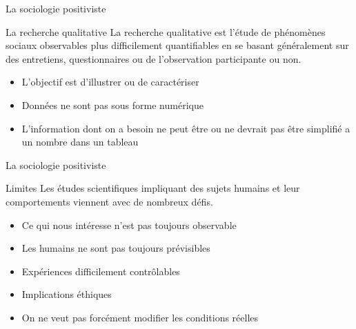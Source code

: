 \documentclass[10pt]{beamer}
\begin{document}
\begin{frame}{La sociologie positiviste}
    \begin{block}{La recherche qualitative}
        La recherche qualitative est l'étude de phénomènes sociaux observables plus difficilement quantifiables en se basant généralement sur des entretiens, questionnaires ou de l'observation participante ou non.
    \begin{itemize}
        \item L'objectif est d'illustrer ou de caractériser
        \item Données ne sont pas sous forme numérique
        \item L'information dont on a besoin ne peut être ou ne devrait pas être simplifié a un nombre dans un tableau
    \end{itemize}
    \end{block}

\end{frame}

\begin{frame}{La sociologie positiviste}
    \begin{block}{Limites}
    Les études scientifiques impliquant des sujets humains et leur comportements viennent avec de nombreux défis.
    \begin{itemize}
        \item Ce qui nous intéresse n'est pas toujours observable
        \item Les humains ne sont pas toujours prévisibles
        \item Expériences difficilement contrôlables
        \item Implications éthiques
        \item On ne veut pas forcément modifier les conditions réelles
    \end{itemize}
    \end{block}
\end{frame}
\end{document}
